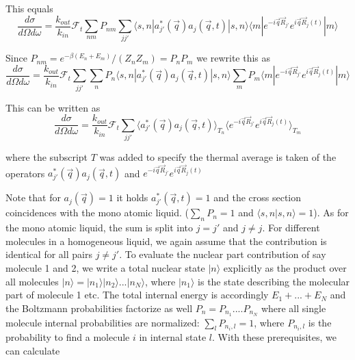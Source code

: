 \documentclass[11pt,a4paper]{article}
\begin{document}
This equals
\begin{equation}
\frac{d \sigma}{ d \Omega d \omega} =
\frac{k_{out}}{k_{in}}
\mathcal{F}_t
\sum_{nm}  P_{nm} 
\sum_{jj'} 
\langle s, n| 
a_{j'}^{*} (\vec q) a _j (\vec q, t) | s, n \rangle
\langle m| e^{-i \vec q \vec R_{j'}} 
e^{i \vec q \vec R_j (t)}   
| m \rangle
\end{equation}


Since $P_{nm} = e^{-\beta (E_n + E_m)}/(Z_n Z_m) = P_n P_m$ we rewrite this as
\begin{equation}
\frac{d \sigma}{ d \Omega d \omega} =
\frac{k_{out}}{k_{in}}
\mathcal{F}_t
\sum_{jj'}
\sum_{n}  P_{n} \langle s, n| 
a_{j'}^{*} (\vec q) a_j (\vec q, t) | s, n \rangle
\sum_{m}  P_{m} 
\langle m| e^{-i \vec q \vec R_{j'}} 
e^{i \vec q \vec R_j (t)}   
| m \rangle
\end{equation}

This can be written as
\begin{equation}
\frac{d \sigma}{ d \Omega d \omega} =
\frac{k_{out}}{k_{in}}
\mathcal{F}_t
\sum_{jj'}
\langle a_{j'}^{*} (\vec q) a_j (\vec q, t) \rangle_{T_n}
\langle e^{-i \vec q \vec R_{j'}} e^{i \vec q \vec R_j (t)} \rangle_{T_m}
\end{equation}

where the subscript $T$ was added to specify the thermal average is taken of the operators $a_{j'}^{*} (\vec q) a_j (\vec q, t)$
and $e^{-i \vec q \vec R_{j'} } e^{i \vec q \vec R_j(t)}$


Note that for $a_j (\vec q) =1$ it holds $a_{j'}^{*} (\vec q, t) = 1$ and the cross section coincidences with the mono atomic liquid.
($\sum_n P_n = 1$ and $\langle s,n | s, n \rangle = 1$). As for the mono atomic liquid, the sum is split into $j = j'$ and $j \ne j$.
For different molecules in a homogeneous liquid, we again assume that the contribution is identical for all pairs
$j \ne j'$. To evaluate the nuclear part contribution of say molecule 1 and 2, we write a total nuclear state
$|n \rangle $ explicitly as the product over all molecules $|n \rangle = |n_1 \rangle |n_2 \rangle ...  |n_N \rangle $, where
$|n_1 \rangle$ is the state describing the molecular part of molecule 1 etc. The total internal energy is accordingly $E_1 + ... + E_N$
and the Boltzmann probabilities factorize as well $P_n = P_{n_1}....P_{n_N}$ where all single molecule internal probabilities are
normalized: $\sum_l P_{n_i, l} = 1$, where $P_{n_i, l}$ is the probability to find a molecule $i$ in internal state $l$.
With these prerequisites, we can calculate 
\end{document}
